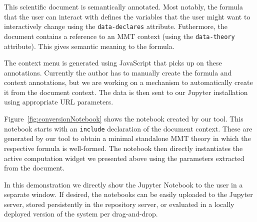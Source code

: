 This scientific document is semantically annotated. 
Most notably, the formula that the user can interact with defines the variables that the user might want to interactively change using the \texttt{data-declares} attribute. 
Futhermore, the document contains a reference to an MMT context (using the \texttt{data-theory} attribute). 
This gives semantic meaning to the formula. 

The context menu is generated using JavaScript that picks up on these annotations.
Currently the author has to manually create the formula and context annotations, but we are working on a mechanism to automatically create it from the document context.
The data is then sent to our Jupyter installation using appropriate URL parameters. 

Figure~\ref{fig:conversionNotebook} shows the notebook created by our tool.
This notebook starts with an \texttt{include} declaration of the document context. 
These are generated by our tool to obtain a minimal standalone MMT theory in which the respective formula is well-formed. 
The notebook then directly instantiates the active computation widget we presented above using the parameters extracted from the document. 

In this demonstration we directly show the Jupyter Notebook to the user in a separate window. 
If desired, the notebooks can be easily uploaded to the Jupyter server, stored persistently in the repository server, or evaluated in a locally deployed version of the system per drag-and-drop.


